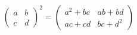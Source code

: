 
\[
\begin{pmatrix} a & b \\ c & d \end{pmatrix}^{2}
=
\begin{pmatrix}
a^{2}+bc & ab+bd \\
ac+cd & bc+d^{2}
\end{pmatrix}
\]
